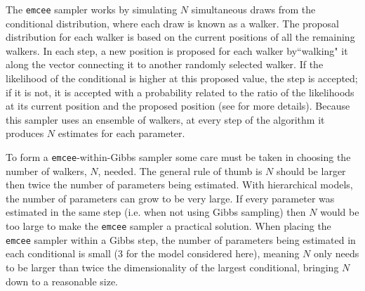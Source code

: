 The \texttt{emcee} sampler works by simulating $N$ simultaneous draws from the conditional distribution, where each draw is known as a walker. The proposal distribution for each walker is based on the current positions of all the remaining walkers. In each step, a new position is proposed for each walker by``walking" it along the vector connecting it to another randomly selected walker. If the likelihood of the conditional is higher at this proposed value, the step is accepted; if it is not, it is accepted with a probability related to the ratio of the likelihoods at its current position and the proposed position (see \citet{Foreman-Mackey:2013} for more details). Because this sampler uses an ensemble of walkers, at every step of the algorithm it produces $N$ estimates for each parameter.

To form a \texttt{emcee}-within-Gibbs sampler some care must be taken in choosing the number of walkers, $N$, needed.  The general rule of thumb is $N$ should be larger then twice the number of parameters being estimated.  With hierarchical models, the number of parameters can grow to be very large.  If every parameter was estimated in the same step (i.e. when not using Gibbs sampling) then $N$ would be too large to make the \texttt{emcee} sampler a practical solution.  When placing the \texttt{emcee} sampler within a Gibbs step, the number of parameters being estimated in each conditional is small (3 for the model considered here), meaning $N$ only needs to be larger than twice the dimensionality of the largest conditional, bringing $N$ down to a reasonable size.



